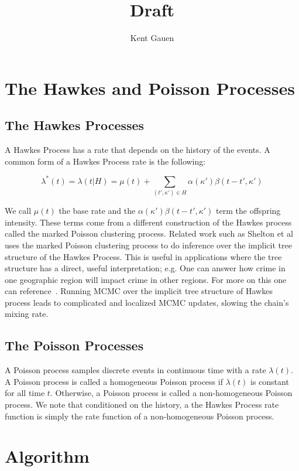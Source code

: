 \documentclass[11pt]{article}
\author{Kent Gauen}
\title{Draft}
\begin{document}
\maketitle

\section{The Hawkes and Poisson Processes}

\subsection{The Hawkes Processes}

\noindent A Hawkes Process has a rate that depends on the history of the events. A common form of a Hawkes Process rate is the following:

\[
  \lambda^*(t)
  =
  \lambda(t|H)
  =
  \mu(t)
  +
  \sum_{(t',\kappa')\in H}\alpha(\kappa')\beta(t-t',\kappa')
\]

\noindent We call $\mu(t)$ the base rate and the $\alpha(\kappa')\beta(t-t',\kappa')$ term the offspring intensity. These terms come from a different construction of the Hawkes process called the marked Poisson clustering process. Related work such as Shelton et al~\cite{AAAI1816985} uses the marked Poisson clustering process to do inference over the implicit tree structure of the Hawkes Process. This is useful in applications where the tree structure has a direct, useful interpretation; e.g. One can answer how crime in one geographic region will impact crime in other regions. For more on this one can reference~\cite{Rasmussen2013}. Running MCMC over the implicit tree structure of Hawkes process leads to complicated and localized MCMC updates, slowing the chain's mixing rate.

\subsection{The Poisson Processes}

\noindent A Poisson process samples discrete events in continuous time with a rate $\lambda(t)$. A Poisson process is called a homogeneous Poisson process if $\lambda(t)$ is constant for all time $t$. Otherwise, a Poisson process is called a non-homogeneous Poisson process. We note that conditioned on the history, a the Hawkes Process rate function is simply the rate function of a non-homogeneous Poisson process.

\section{Algorithm}
\end{document}
